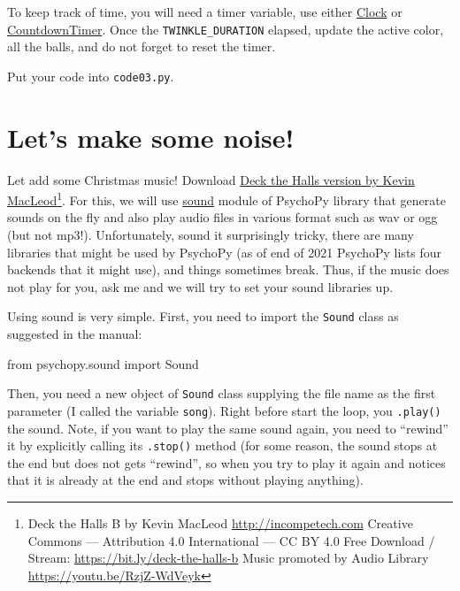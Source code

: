 \documentclass[
]{book}
\newenvironment{Shaded}{\begin{snugshade}}{\end{snugshade}}
\newcommand{\ImportTok}[1]{#1}
\newcommand{\NormalTok}[1]{#1}
\begin{document}
To keep track of time, you will need a timer variable, use either \href{https://psychopy.org/api/clock.html\#psychopy.clock.Clock}{Clock} or \href{https://psychopy.org/api/clock.html\#psychopy.clock.CountdownTimer}{CountdownTimer}. Once the \texttt{TWINKLE\_DURATION} elapsed, update the active color, all the balls, and do not forget to reset the timer.

Put your code into \texttt{code03.py}.

\hypertarget{lets-make-some-noise}{%
\section{Let's make some noise!}\label{lets-make-some-noise}}

Let add some Christmas music! Download \href{material/Deck\%20the\%20Halls\%20B.ogg}{Deck the Halls version by Kevin MacLeod}\footnote{Deck the Halls B by Kevin MacLeod \url{http://incompetech.com}
  Creative Commons --- Attribution 4.0 International --- CC BY 4.0
  Free Download / Stream: \url{https://bit.ly/deck-the-halls-b}
  Music promoted by Audio Library \url{https://youtu.be/RzjZ-WdVeyk}}. For this, we will use \href{https://psychopy.org/api/sound.html}{sound} module of PsychoPy library that generate sounds on the fly and also play audio files in various format such as wav or ogg (but not mp3!). Unfortunately, sound it surprisingly tricky, there are many libraries that might be used by PsychoPy (as of end of 2021 PsychoPy lists four backends that it might use), and things sometimes break. Thus, if the music does not play for you, ask me and we will try to set your sound libraries up.

Using sound is very simple. First, you need to import the \texttt{Sound} class as suggested in the manual:

\begin{Shaded}
\begin{Highlighting}[]
\ImportTok{from}\NormalTok{ psychopy.sound }\ImportTok{import}\NormalTok{ Sound}
\end{Highlighting}
\end{Shaded}

Then, you need a new object of \texttt{Sound} class supplying the file name as the first parameter (I called the variable \texttt{song}). Right before start the loop, you \texttt{.play()} the sound. Note, if you want to play the same sound again, you need to ``rewind'' it by explicitly calling its \texttt{.stop()} method (for some reason, the sound stops at the end but does not gets ``rewind'', so when you try to play it again and notices that it is already at the end and stops without playing anything).
\end{document}
